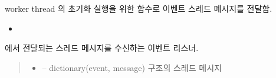 \documentclass[a4paper,10pt,english]{sphinxmanual}
\begin{document}
\begin{fulllineitems}
\begin{fulllineitems}
\begin{itemize}
\end{itemize}



\end{fulllineitems}


\begin{fulllineitems}
\label{\detokenize{_SessionManager:SessionManager._srInit}}
\pysigstartsignatures
{}
\pysigstopsignatures
\sphinxAtStartPar
{\hyperref[\detokenize{_SessionRequester:sessionrequester}]{}} worker thread 의 초기화 실행을 위한 함수로  이벤트 스레드 메시지를 전달함.


\nopagebreak

\begin{itemize}
\item {} 
\sphinxAtStartPar
{\hyperref[\detokenize{_SessionRequester:SessionRequester._smListener}]{}}

\end{itemize}



\end{fulllineitems}


\begin{fulllineitems}
\label{\detokenize{_SessionManager:SessionManager._srListener}}
\pysigstartsignatures
{}
\pysigstopsignatures
\sphinxAtStartPar
{\hyperref[\detokenize{_SessionRequester:sessionrequester}]{}} 에서 전달되는 스레드 메시지를 수신하는 이벤트 리스너.
\begin{quote}\begin{description}
\begin{itemize}
\item {} 
\sphinxAtStartPar
{} – dictionary(event, message) 구조의 스레드 메시지


\end{itemize}
\end{description}
\end{quote}
\end{fulllineitems}
\end{fulllineitems}
\end{document}
